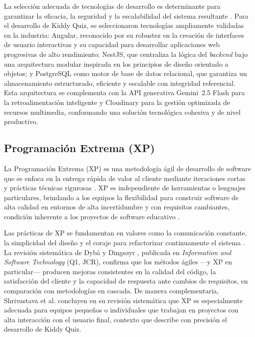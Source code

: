 La selección adecuada de tecnologías de desarrollo es determinante para garantizar la eficacia, la seguridad y la escalabilidad del sistema resultante \cite{dyba2008agile}. Para el desarrollo de Kiddy Quiz, se seleccionaron tecnologías ampliamente validadas en la industria: Angular, reconocido por su robustez en la creación de interfaces de usuario interactivas y su capacidad para desarrollar aplicaciones web progresivas de alto rendimiento; NestJS, que centraliza la lógica del \textit{backend} bajo una arquitectura modular inspirada en los principios de diseño orientado a objetos; y PostgreSQL como motor de base de datos relacional, que garantiza un almacenamiento estructurado, eficiente y escalable con integridad referencial. Esta arquitectura se complementa con la API generativa Gemini~2.5 Flash para la retroalimentación inteligente y Cloudinary para la gestión optimizada de recursos multimedia, conformando una solución tecnológica cohesiva y de nivel productivo.

\subsection{Programación Extrema (XP)}

La Programación Extrema (XP) es una metodología ágil de desarrollo de software que se enfoca en la entrega rápida de valor al cliente mediante iteraciones cortas y prácticas técnicas rigurosas \cite{beck2004xp}. XP es independiente de herramientas o lenguajes particulares, brindando a los equipos la flexibilidad para construir software de alta calidad en entornos de alta incertidumbre y con requisitos cambiantes, condición inherente a los proyectos de software educativo \cite{dyba2008agile}.

Las prácticas de XP se fundamentan en valores como la comunicación constante, la simplicidad del diseño y el coraje para refactorizar continuamente el sistema \cite{beck2004xp}. La revisión sistemática de Dybå y Dingsøyr \cite{dyba2008agile}, publicada en \textit{Information and Software Technology} (Q1, JCR), confirma que los métodos ágiles —y XP en particular— producen mejoras consistentes en la calidad del código, la satisfacción del cliente y la capacidad de respuesta ante cambios de requisitos, en comparación con metodologías en cascada. De manera complementaria, Shrivastava et al. \cite{shrivastava2021xpreview} concluyen en su revisión sistemática que XP es especialmente adecuada para equipos pequeños o individuales que trabajan en proyectos con alta interacción con el usuario final, contexto que describe con precisión el desarrollo de Kiddy Quiz.

